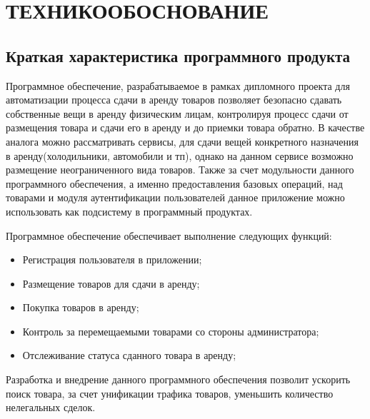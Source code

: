 \FPeval{\netProfitExact}{(\profitIncWithOneIndex + \profitIncFullYearWithTwoIndex + \profitIncFullYearWithThreeIndex) / \paybackInYears}



\section{ТЕХНИКО ОБОСНОВАНИЕ}
\label{sec:economics}

\subsection{Краткая характеристика программного продукта}
\label{sub:economics:description}

Программное обеспечение, разрабатываемое в рамках дипломного проекта для автоматизации процесса сдачи в аренду товаров позволяет безопасно сдавать собственные вещи в аренду физическим лицам, контролируя процесс сдачи от размещения товара и сдачи его в аренду и до приемки товара обратно.
В качестве аналога можно рассматривать сервисы, для сдачи вещей конкретного назначения в аренду(холодильники, автомобили и тп), однако на данном сервисе возможно размещение неограниченного вида товаров.
Также за счет модульности данного программного обеспечения, а именно предоставления базовых операций, над товарами и модуля аутентификации пользователей данное приложение можно использовать как подсистему в программный продуктах.

Программное обеспечение обеспечивает выполнение следующих функций:
\begin{itemize}
  \item Регистрация пользователя в приложении;
  \item Размещение товаров для сдачи в аренду;
  \item Покупка товаров в аренду;
  \item Контроль за перемещаемыми товарами со стороны администратора;
  \item Отслеживание статуса сданного товара в аренду;
\end{itemize}

Разработка и внедрение данного программного обеспечения позволит ускорить поиск товара, за счет унификации трафика товаров, уменьшить количество нелегальных сделок.

